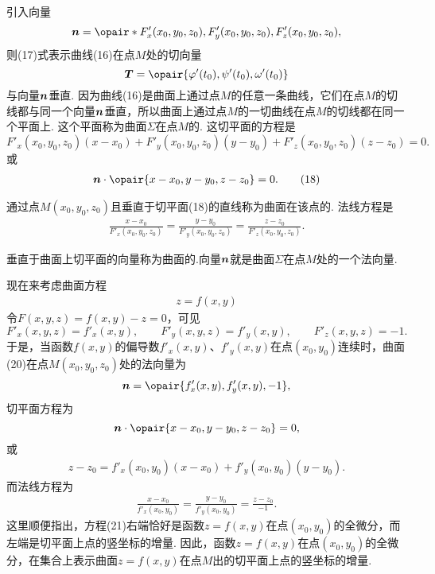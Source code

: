 引入向量\begin{equation}
\mat{n}=\opair*{F'_x(x_0,y_0,z_0),F'_y(x_0,y_0,z_0),F'_z(x_0,y_0,z_0)},
\end{equation}则(17)式表示曲线(16)在点\(M\)处的切向量\[
\mat{T} = \opair{\varphi'(t_0),\psi'(t_0),\omega'(t_0)}
\]与向量\(\boldsymbol{n}\)垂直.
因为曲线(16)是曲面上通过点\(M\)的任意一条曲线，它们在点\(M\)的切线都与同一个向量\(\boldsymbol{n}\)垂直，所以曲面上通过点\(M\)的一切曲线在点\(M\)的切线都在同一个平面上.
这个平面称为曲面\(\Sigma\)在点\(M\)的.
这切平面的方程是\[
F'_x(x_0,y_0,z_0) (x-x_0)
+ F'_y(x_0,y_0,z_0) (y-y_0)
+ F'_z(x_0,y_0,z_0) (z-z_0)
= 0.
\]或\begin{gather}
\mat{n}\cdot\opair{x-x_0,y-y_0,z-z_0}=0.
\tag{18}
\end{gather}

通过点\(M(x_0,y_0,z_0)\)且垂直于切平面(18)的直线称为曲面在该点的.
法线方程是\begin{gather}
\frac{x-x_0}{F'_x(x_0,y_0,z_0)}
=\frac{y-y_0}{F'_y(x_0,y_0,z_0)}
=\frac{z-z_0}{F'_z(x_0,y_0,z_0)}.
\tag{19}
\end{gather}

垂直于曲面上切平面的向量称为曲面的.向量\(\boldsymbol{n}\)就是曲面\(\Sigma\)在点\(M\)处的一个法向量.


现在来考虑曲面方程\begin{gather}
z = f(x,y)
\tag{20}
\end{gather}
令\(F(x,y,z)=f(x,y)-z=0\)，可见\[
F'_x(x,y,z) = f'_x(x,y),
\qquad
F'_y(x,y,z) = f'_y(x,y),
\qquad
F'_z(x,y,z) = -1.
\]于是，当函数\(f(x,y)\)的偏导数\(f'_x(x,y)\)、\(f'_y(x,y)\)在点\((x_0,y_0)\)连续时，曲面(20)在点\(M(x_0,y_0,z_0)\)处的法向量为\[
\mat{n}=\opair{f'_x(x,y),f'_y(x,y),-1},
\]切平面方程为\[
\mat{n}\cdot\opair{x-x_0,y-y_0,z-z_0}=0,
\]或\begin{gather}
z-z_0 = f'_x(x_0,y_0) (x-x_0) + f'_y(x_0,y_0) (y-y_0).
\tag{21}
\end{gather}而法线方程为\begin{gather}
\frac{x-x_0}{f'_x(x_0,y_0)}
=\frac{y-y_0}{f'_y(x_0,y_0)}
=\frac{z-z_0}{-1}.
\tag{22}
\end{gather}
这里顺便指出，方程(21)右端恰好是函数\(z = f(x,y)\)在点\((x_0,y_0)\)的全微分，而左端是切平面上点的竖坐标的增量.
因此，函数\(z = f(x,y)\)在点\((x_0,y_0)\)的全微分，在集合上表示曲面\(z = f(x,y)\)在点\(M\)出的切平面上点的竖坐标的增量.

